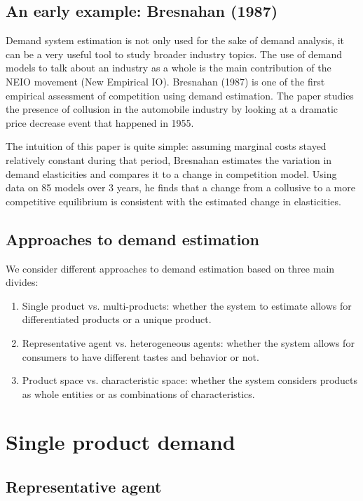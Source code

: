 \subsection{An early example: Bresnahan (1987)}

Demand system estimation is not only used for the sake of demand analysis, it can be a very useful tool to study broader industry topics. The use of demand models to talk about an industry as a whole is the main contribution of the NEIO movement (New Empirical IO). Bresnahan (1987) is one of the first empirical assessment of competition using demand estimation. The paper studies the presence of collusion in the automobile industry by looking at a dramatic price decrease event that happened in 1955.

The intuition of this paper is quite simple: assuming marginal costs stayed relatively constant during that period, Bresnahan estimates the variation in demand elasticities and compares it to a change in competition model. Using data on 85 models over 3 years, he finds that a change from a collusive to a more competitive equilibrium is consistent with the estimated change in elasticities.

\subsection{Approaches to demand estimation}

We consider different approaches to demand estimation based on three main divides:\begin{enumerate}
\item Single product vs. multi-products: whether the system to estimate allows for differentiated products or a unique product.
\item Representative agent vs. heterogeneous agents: whether the system allows for consumers to have different tastes and behavior or not.
\item Product space vs. characteristic space: whether the system considers products as whole entities or as combinations of characteristics.
\end{enumerate}

\section{Single product demand}

\subsection{Representative agent}

